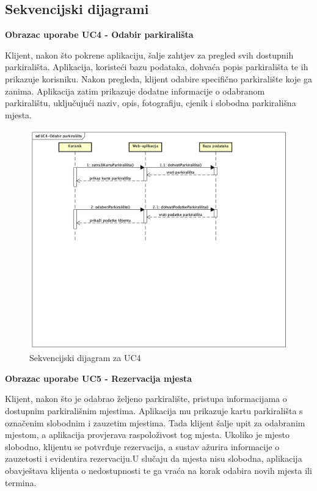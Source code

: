 				
			\subsection{Sekvencijski dijagrami}
				
				 \textbf{Obrazac uporabe UC4 - Odabir parkirališta}
				  
				
				 {Klijent, nakon što pokrene aplikaciju, šalje zahtjev za pregled svih dostupnih parkirališta. Aplikacija, koristeći bazu podataka, dohvaća popis parkirališta te ih prikazuje korisniku. Nakon pregleda, klijent odabire specifično parkiralište koje ga zanima. Aplikacija zatim prikazuje dodatne informacije o odabranom parkiralištu, uključujući naziv, opis, fotografiju, cjenik i slobodna parkirališna mjesta.}
				    
				       \begin{figure}[hbt!]
				    	   \centering
				    	   \includegraphics[width=0.7\linewidth]{slike/SeqDijagram4.png}
				    	   \caption{Sekvencijski dijagram za UC4}
				        	\label{fig:SeqDijagram4}
				       \end{figure}
				    
				    
				    
				    
				    
				    
				   \textbf{Obrazac uporabe UC5 - Rezervacija mjesta}
				   
				   
				  
				   {Klijent, nakon što je odabrao željeno parkiralište, pristupa informacijama o dostupnim parkirališnim mjestima. Aplikacija mu prikazuje kartu parkirališta s označenim slobodnim i zauzetim mjestima. Tada klijent šalje upit za odabranim mjestom, a aplikacija provjerava raspoloživost tog mjesta. Ukoliko je mjesto slobodno, klijentu se potvrđuje rezervacija, a sustav ažurira informacije o zauzetosti i evidentira rezervaciju.U slučaju da mjesta nisu slobodna, aplikacija obavještava klijenta o nedostupnosti te ga vraća na korak odabira novih mjesta ili termina.}
				   
